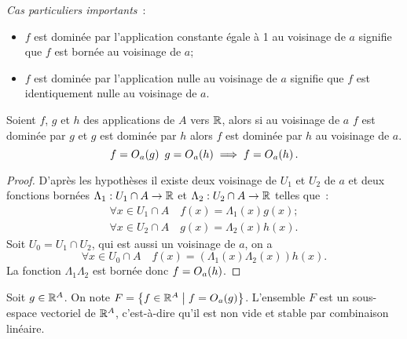 \emph{Cas particuliers importants}~:
\begin{itemize}
  \item \(f\) est dominée par l'application constante égale à 1 au voisinage de 
    \(a\) signifie que \(f\) est bornée au voisinage de \(a\);
  \item \(f\) est dominée par l'application nulle au voisinage de \(a\) signifie 
    que \(f\) est identiquement nulle au voisinage de \(a\).
\end{itemize}

\begin{prop}[Transitivité]
  Soient \(f\), \(g\) et \(h\) des applications de \(A\) vers \(\mathbb{R}\), alors si 
  au voisinage de \(a\) \(f\) est dominée par \(g\) et \(g\) est dominée par 
  \(h\) alors \(f\) est dominée par \(h\) au voisinage de \(a\).
  \begin{equation}
    f=O\mathopen{}_{a}\left(g\right) \ g=O\mathopen{}_{a}\left(h\right) \implies f=O\mathopen{}_{a}\left(h\right).
  \end{equation}
\end{prop}
\begin{proof}
  D'après les hypothèses il existe deux voisinage de \(U_1\) et \(U_2\) de \(a\) 
  et deux fonctions bornées \(\Lambda_1:U_1 \cap A \rightarrow \mathbb{R}\) et 
  \(\Lambda_2:U_2 \cap A \rightarrow \mathbb{R}\) telles que~:
  \begin{gather}
    \forall x \in U_1\cap A \quad f(x)=\Lambda_1(x)g(x);\\
    \forall x \in U_2\cap A \quad g(x)=\Lambda_2(x)h(x).
  \end{gather}
  Soit \(U_0=U_1 \cap U_2\), qui est aussi un voisinage de \(a\), on a
  \begin{equation}
    \forall x \in U_0 \cap A \quad f(x) = (\Lambda_1(x) \Lambda_2(x)) h(x).
  \end{equation}
  La fonction \(\Lambda_1 \Lambda_2\) est bornée donc \(f=O\mathopen{}_{a}\left(h\right)\).
\end{proof}
\begin{prop}
  Soit \(g \in \mathbb{R}^A\). On note \(F=\left\{f \in \mathbb{R}^A\mathrel{}\middle|\mathrel{}f=O\mathopen{}_{a}\left(g\right)\right\}\). 
  L'ensemble \(F\) est un sous-espace vectoriel de \(\mathbb{R}^A\), c'est-à-dire qu'il 
  est non vide et stable par combinaison linéaire.
\end{prop}
